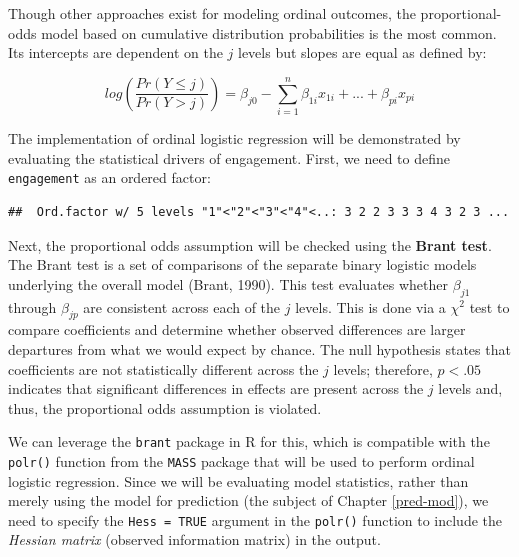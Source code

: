 \documentclass[
]{book}
\newenvironment{Shaded}{\begin{snugshade}}{\end{snugshade}}
\newcommand{\AttributeTok}[1]{\textcolor[rgb]{0.77,0.63,0.00}{#1}}
\newcommand{\CommentTok}[1]{\textcolor[rgb]{0.56,0.35,0.01}{\textit{#1}}}
\newcommand{\DecValTok}[1]{\textcolor[rgb]{0.00,0.00,0.81}{#1}}
\newcommand{\FunctionTok}[1]{\textcolor[rgb]{0.00,0.00,0.00}{#1}}
\newcommand{\NormalTok}[1]{#1}
\newcommand{\OtherTok}[1]{\textcolor[rgb]{0.56,0.35,0.01}{#1}}
\newcommand{\SpecialCharTok}[1]{\textcolor[rgb]{0.00,0.00,0.00}{#1}}
\begin{document}
Though other approaches exist for modeling ordinal outcomes, the proportional-odds model based on cumulative distribution probabilities is the most common. Its intercepts are dependent on the \(j\) levels but slopes are equal as defined by:

\[ log(\frac{Pr(Y \le j)} {Pr(Y > j)}) = \beta_{j0} - \displaystyle\sum_{i=1}^{n} \beta_{1i} x_{1i} + ... + \beta_{pi} x_{pi} \]

The implementation of ordinal logistic regression will be demonstrated by evaluating the statistical drivers of engagement. First, we need to define \texttt{engagement} as an ordered factor:

\begin{Shaded}
\end{Shaded}

\begin{verbatim}
##  Ord.factor w/ 5 levels "1"<"2"<"3"<"4"<..: 3 2 2 3 3 3 4 3 2 3 ...
\end{verbatim}

Next, the proportional odds assumption will be checked using the \textbf{Brant test}. The Brant test is a set of comparisons of the separate binary logistic models underlying the overall model (Brant, 1990). This test evaluates whether \(\beta_{j1}\) through \(\beta_{jp}\) are consistent across each of the \(j\) levels. This is done via a \(\chi^2\) test to compare coefficients and determine whether observed differences are larger departures from what we would expect by chance. The null hypothesis states that coefficients are not statistically different across the \(j\) levels; therefore, \(p < .05\) indicates that significant differences in effects are present across the \(j\) levels and, thus, the proportional odds assumption is violated.

We can leverage the \texttt{brant} package in R for this, which is compatible with the \texttt{polr()} function from the \texttt{MASS} package that will be used to perform ordinal logistic regression. Since we will be evaluating model statistics, rather than merely using the model for prediction (the subject of Chapter \ref{pred-mod}), we need to specify the \texttt{Hess\ =\ TRUE} argument in the \texttt{polr()} function to include the \emph{Hessian matrix} (observed information matrix) in the output.
\end{document}
